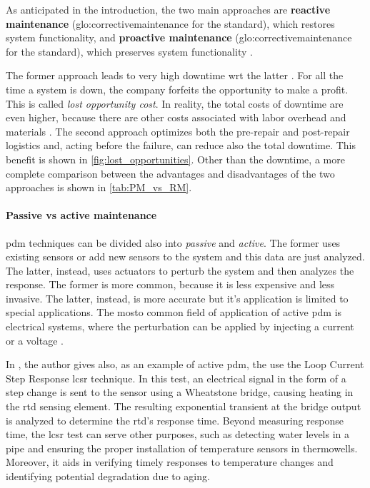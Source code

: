As anticipated in the introduction, the two main approaches are \textbf{reactive maintenance} (\gls{glo:correctivemaintenance} for the standard), which restores system functionality, and \textbf{proactive maintenance} (\gls{glo:correctivemaintenance} for the standard), which preserves system functionality \cite{Rely_maint_book}.

The former approach leads to very high downtime \gls{wrt} the latter \cite{NIST}. For all the time a system is down, the company forfeits the opportunity to make a profit. This is called \emph{lost opportunity cost}. In reality, the total costs of downtime are even higher, because there are other costs associated with labor overhead and materials \cite{Lost_Opport_Cost}. The second approach optimizes both the pre-repair and post-repair logistics and, acting before the failure, can reduce also the total downtime. This benefit is shown in \autoref{fig:lost_opportunities}. Other than the downtime, a more complete comparison between the advantages and disadvantages of the two approaches is shown in \autoref{tab:PM_vs_RM}.



\paragraph*{Passive vs active maintenance}
\gls{pdm} techniques can be divided also into \emph{passive} and \emph{active}. The former uses existing sensors or add new sensors to the system and this data are just analyzed. The latter, instead, uses actuators to perturb the system and then analyzes the response. The former is more common, because it is less expensive and less invasive. The latter, instead, is more accurate but it's application is limited to special applications. The mosto common field of application of active \gls{pdm} is electrical systems, where the perturbation can be applied by injecting a current or a voltage \cite{State_Art_Hasemian_2011}.

In \cite{State_Art_Hasemian_2011}, the author gives also, as an example of active \gls{pdm}, the use the Loop Current Step Response \gls{lcsr} technique. In this test, an electrical signal in the form of a step change is sent to the sensor using a Wheatstone bridge, causing heating in the \gls{rtd} sensing element. The resulting exponential transient at the bridge output is analyzed to determine the \gls{rtd}'s response time. Beyond measuring response time, the \gls{lcsr} test can serve other purposes, such as detecting water levels in a pipe and ensuring the proper installation of temperature sensors in thermowells. Moreover, it aids in verifying timely responses to temperature changes and identifying potential degradation due to aging.

